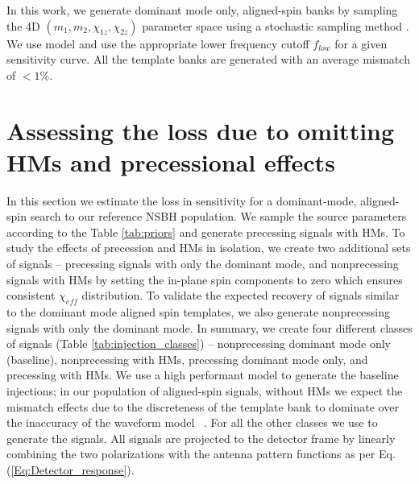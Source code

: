 In this work, we generate dominant mode only, aligned-spin banks by sampling the 4D $(m_1, m_2, \chi_{1z}, \chi_{2z})$ parameter space using a stochastic sampling method \cite{Harry:2009ea,Babak:2008rb}. We use  model and use the appropriate lower frequency cutoff $f_{low}$ for a given sensitivity curve. All the template banks are generated with an average mismatch of $< 1\%$. 


\section{Assessing the loss due to omitting HMs and precessional effects}\label{sec:results}
In this section we estimate the loss in sensitivity for a dominant-mode, aligned-spin search to our reference NSBH population. We sample the source parameters according to the Table \ref{tab:priors} and generate precessing signals with HMs. To study the effects of precession and HMs in isolation, we create two additional sets of signals -- precessing signals with only the dominant mode, and nonprecessing signals with HMs by setting the in-plane spin components to zero which ensures consistent $\chi_{eff}$ distribution. To validate the expected recovery of signals similar to the dominant mode aligned spin templates, we also generate nonprecessing signals with only the dominant mode. In summary, we create four different classes of signals (Table \ref{tab:injection_classes}) -- nonprecessing dominant mode only (baseline), nonprecessing with HMs,  precessing dominant mode only, and precessing with HMs. We use  \cite{Husa:2015iqa, Khan:2015jqa} a high performant model to generate the baseline injections; in our population of aligned-spin signals, without HMs we expect the mismatch effects due to the discreteness of the template bank to dominate over the inaccuracy of the waveform model ~\cite{Pratten:2020fqn}. For all the other classes we use  to generate the signals. All signals are projected to the detector frame by linearly combining the two polarizations with the antenna pattern functions as per Eq. (\ref{Eq:Detector_response}). 

